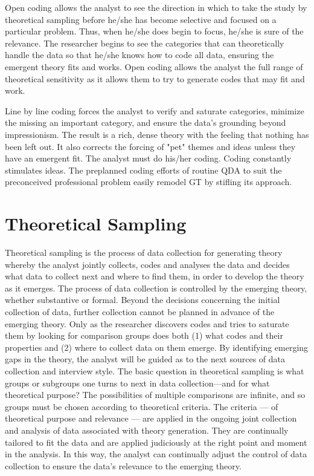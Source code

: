 Open coding allows the analyst to see the direction in which to take the study by theoretical sampling before he/she has become selective and focused on a particular problem. 
Thus, when he/she does begin to focus, he/she is sure of the relevance. 
The researcher begins to see the categories that can theoretically handle the data so that he/she knows how to code all data, ensuring the emergent theory fits and works. 
Open coding allows the analyst the full range of theoretical sensitivity as it allows them to try to generate codes that may fit and work.

Line by line coding forces the analyst to verify and saturate categories, minimize the missing an important category, and ensure the data's grounding beyond impressionism. 
The result is a rich, dense theory with the feeling that nothing has been left out. 
It also corrects the forcing of "pet" themes and ideas unless they have an emergent fit. 
The analyst must do his/her coding. 
Coding constantly stimulates ideas. 
The preplanned coding efforts of routine QDA to suit the preconceived professional problem easily remodel GT by stifling its approach.

\section*{Theoretical Sampling}

Theoretical sampling is the process of data collection for generating theory whereby the analyst jointly collects, 
codes and analyses the data and decides what data to collect next and where to find them, 
in order to develop the theory as it emerges. 
The process of data collection is controlled by the emerging theory, 
whether substantive or formal. 
Beyond the decisions concerning the initial collection of data, 
further collection cannot be planned in advance of the emerging theory. 
Only as the researcher discovers codes and tries to saturate them by looking for comparison groups does both 
(1) what codes and their properties and 
(2) where to collect data on them emerge. 
By identifying emerging gaps in the theory, 
the analyst will be guided as to the next sources of data collection and interview style. 
The basic question in theoretical sampling is what groups or subgroups one turns to next in data collection—and for what theoretical purpose? 
The possibilities of multiple comparisons are infinite, and so groups must be chosen according to theoretical criteria. 
The criteria --- of theoretical purpose and relevance --- are applied in the ongoing joint collection and analysis of data associated with theory generation. 
They are continually tailored to fit the data and are applied judiciously at the right point and moment in the analysis. 
In this way, the analyst can continually adjust the control of data collection to ensure the data’s relevance to the emerging theory.

